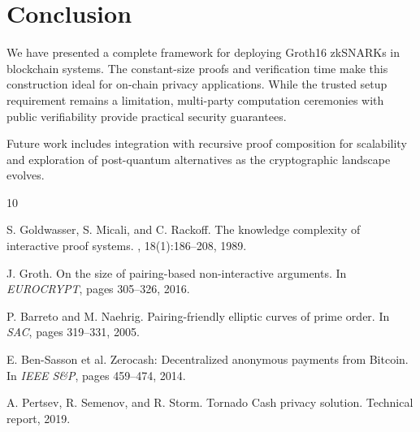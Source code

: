 \documentclass[11pt,a4paper]{article}
\begin{document}
\section{Conclusion}

We have presented a complete framework for deploying Groth16 zkSNARKs in blockchain systems. The constant-size proofs and verification time make this construction ideal for on-chain privacy applications. While the trusted setup requirement remains a limitation, multi-party computation ceremonies with public verifiability provide practical security guarantees.

Future work includes integration with recursive proof composition for scalability and exploration of post-quantum alternatives as the cryptographic landscape evolves.


\begin{thebibliography}{10}

S. Goldwasser, S. Micali, and C. Rackoff.
\newblock The knowledge complexity of interactive proof systems.
, 18(1):186--208, 1989.

J. Groth.
\newblock On the size of pairing-based non-interactive arguments.
\newblock In {\em EUROCRYPT}, pages 305--326, 2016.

P. Barreto and M. Naehrig.
\newblock Pairing-friendly elliptic curves of prime order.
\newblock In {\em SAC}, pages 319--331, 2005.

E. Ben-Sasson et al.
\newblock Zerocash: Decentralized anonymous payments from Bitcoin.
\newblock In {\em IEEE S\&P}, pages 459--474, 2014.

A. Pertsev, R. Semenov, and R. Storm.
\newblock Tornado Cash privacy solution.
\newblock Technical report, 2019.

\end{thebibliography}
\end{document}
